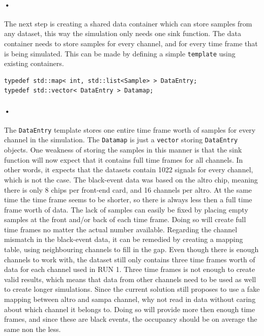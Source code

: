 \documentclass[a4paper, 12pt]{report}
\newcommand{\codeword}[1]{\texttt{#1}}
\begin{document}
\paragraph{•}
The next step is creating a shared data container which can store samples from any dataset, this way the simulation only needs one sink function.
The data container needs to store samples for every channel, and for every time frame that is being simulated.
This can be made by defining a simple \codeword{template} using existing containers.

\begin{lstlisting}[caption=Data container., label=lst:data-template]
typedef std::map< int, std::list<Sample> > DataEntry;
typedef std::vector< DataEntry > Datamap;
\end{lstlisting}

\paragraph{•}
The \codeword{DataEntry} template stores one entire time frame worth of samples for every channel in the simulation.
The \codeword{Datamap} is just a \codeword{vector} storing \codeword{DataEntry} objects.
One weakness of storing the samples in this manner is that the sink function will now expect that it contains full time frames for all channels.
In other words, it expects that the datasets contain 1022 signals for every channel, which is not the case.
The black-event data was based on the \gls{altro} chip, meaning there is only 8 chips per front-end card, and 16 channels per \gls{altro}.
At the same time the time frame seems to be shorter, so there is always less then a full time frame worth of data.
The lack of samples can easily be fixed by placing empty samples at the front and/or back of each time frame.
Doing so will create full time frames no matter the actual number available.
Regarding the channel mismatch in the black-event data, it can be remedied by creating a mapping table, using neighbouring channels to fill in the gap.
Even though there is enough channels to work with, the dataset still only contains three time frames worth of data for each channel used in RUN 1.
Three time frames is not enough to create valid results, which means that data from other channels need to be used as well to create longer simulations.
Since the current solution still proposes to use a fake mapping between \gls{altro} and \gls{sampa} channel, why not read in data without caring about which channel it belongs to.
Doing so will provide more then enough time frames, and since these are black events, the occupancy should be on average the same non the less.
\end{document}
